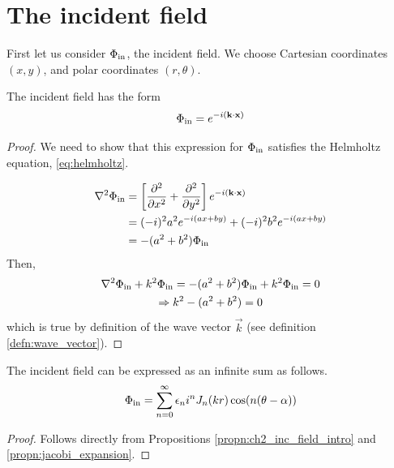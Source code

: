 \section{The incident field}
First let us consider $\Phi_{\text{in}}$, the incident field. We choose Cartesian coordinates $(x,y)$, and polar coordinates $(r, \theta)$.
    \begin{propn}\label{propn:ch2_inc_field_intro}
    The incident field has the form
        \begin{equation}
            \Phi_{\text{in}} = e^{-i(\mathbf{k}\cdot\mathbf{x})}
        \end{equation}
    \end{propn}
    \begin{proof}
    We need to show that this expression for $\Phi_{\text{in}}$ satisfies the Helmholtz equation, \eqref{eq:helmholtz}. \par
        \begin{align*}
            \nabla^2 \Phi_{\text{in}}
            &= \left[ \frac{\partial ^2}{\partial x^2} + \frac{\partial ^2}{\partial y^2} \right] e^{-i(\mathbf{k}\cdot\mathbf{x})} \\
            &= (-i)^2 a^2 e^{-i(ax+by)} + (-i)^2b^2 e^{-i(ax+by)}\\
            &= -(a^2+b^2)\Phi_{\text{in}}
        \end{align*}
    Then,
        \begin{gather*}
            \nabla^2 \Phi_{\text{in}} + k^2 \Phi_{\text{in}}
            = -(a^2+b^2)\Phi_{\text{in}} + k^2 \Phi_{\text{in}} = 0\\
            \Rightarrow k^2-(a^2+b^2)=0
        \end{gather*}
    which is true by definition of the wave vector $\vec{k}$ (see definition \ref{defn:wave_vector}).
    \end{proof}

%
    \begin{propn}\label{propn:ch2_inc_field_infty_sum}
    The incident field can be expressed as an infinite sum as follows.
        \begin{equation*}\label{eq:ch2_inc_field_infty_sum}
            \Phi_{\text{in}} = \sum^{\infty}_{n=0} \epsilon_n i^n J_n(kr) \cos (n(\theta - \alpha))
        \end{equation*}
    \end{propn}
    \begin{proof}
    Follows directly from Propositions \ref{propn:ch2_inc_field_intro} and  \ref{propn:jacobi_expansion}.
    \end{proof}

